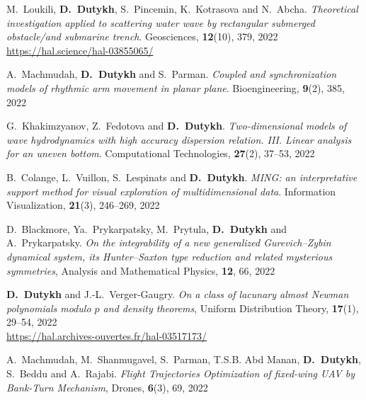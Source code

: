 \begin{etaremune}
  \item M.~Loukili, \textbf{D.~Dutykh}, S.~Pincemin, K.~Kotrasova and N.~Abcha. \textit{Theoretical investigation applied to scattering water wave by rectangular submerged obstacle/and submarine trench}. Geosciences, \textbf{12}(10), 379, 2022 \\ %
  \url{https://hal.science/hal-03855065/}
  
  
  \item A.~Machmudah, \textbf{D.~Dutykh} and S.~Parman. \textit{Coupled and synchronization models of rhythmic arm movement in planar plane}. Bioengineering, \textbf{9}(2), 385, 2022 %
  
  \item G.~Khakimzyanov, Z.~Fedotova and \textbf{D.~Dutykh}. \textit{Two-dimensional models of wave hydrodynamics with high accuracy dispersion relation. III. Linear analysis for an uneven bottom}. Computational Technologies, \textbf{27}(2), 37--53, 2022 %
  
  \item B.~Colange, L.~Vuillon, S.~Lespinats and \textbf{D.~Dutykh}. \textit{MING: an interpretative support method for visual exploration of multidimensional data}. Information Visualization, \textbf{21}(3), 246--269, 2022 %
  
  \item D.~Blackmore, Ya.~Prykarpatsky, M.~Prytula, \textbf{D.~Dutykh} and A.~Prykarpatsky. \textit{On the integrability of a new generalized Gurevich--Zybin dynamical system, its Hunter--Saxton type reduction and related mysterious symmetries}, Analysis and Mathematical Physics, \textbf{12}, 66, 2022 %
  
  \item \textbf{D.~Dutykh} and J.-L.~Verger-Gaugry. \textit{On a class of lacunary almost Newman polynomials modulo $p$ and density theorems}, Uniform Distribution Theory, \textbf{17}(1), 29--54, 2022 \\ %
  \url{https://hal.archives-ouvertes.fr/hal-03517173/}
  
  \item A.~Machmudah, M.~Shanmugavel, S.~Parman, T.S.B. Abd Manan, \textbf{D.~Dutykh}, S.~Beddu and A.~Rajabi. \textit{Flight Trajectories Optimization of fixed-wing UAV by Bank-Turn Mechanism}, Drones, \textbf{6}(3), 69, 2022 %
  

\end{etaremune}
